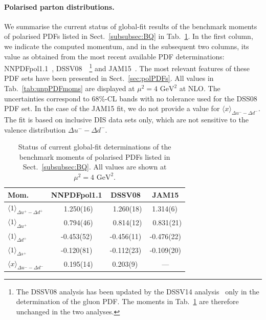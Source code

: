 \paragraph{Polarised parton distributions.}
%
We summarise the current status of global-fit results of the benchmark
moments of polarised PDFs listed in Sect.~\ref{subsubsec:BQ} in 
Tab.~\ref{tab:polPDFmoms}.
%
In the first column, we indicate the computed momentum, and in the subsequent 
two columns, its value as obtained from the most recent available PDF 
determinations: NNPDFpol1.1~\cite{Nocera:2014gqa}, 
DSSV08~\cite{deFlorian:2009vb}~\footnote{The DSSV08 analysis has been updated
by the DSSV14 analysis~\cite{deFlorian:2014yva} only in the determination
of the gluon PDF. The moments in Tab.~\ref{tab:polPDFmoms} are therefore  
unchanged in the two analyses.} and JAM15~\cite{Sato:2016tuz}.
%
The most relevant features of these PDF sets have been presented in
Sect.~\ref{sec:polPDFs}.
%
All values in Tab.~\ref{tab:unpPDFmoms} are displayed
at $\mu^2=4\mbox{ GeV}^2$ at NLO.
%
The uncertainties correspond to 68\%-CL bands with no tolerance used for the 
DSS08 PDF set.
%
In the case of the JAM15 fit, we do not provide a value for 
$\langle x \rangle _{\Delta u^--\Delta d^-}$.
%
The fit is based on inclusive DIS data sets only, which are not sensitive to 
the valence distribution $\Delta u^- - \Delta d^-$.

\begin{table}[!t]
\centering
\renewcommand{\arraystretch}{1.2}
\begin{tabular}{lccc}
\toprule
Mom. 
& NNPDFpol1.1 & DSSV08 & JAM15 \\
\midrule
$\langle 1 \rangle_{\Delta u^+-\Delta d^+}$ &
\ 1.250(16) & \ 1.260(18) & 1.314(6)\, \\
$\langle 1 \rangle_{\Delta u^+}$ &
\ 0.794(46) & \ 0.814(12) & \ 0.831(21)\\
$\langle 1 \rangle_{\Delta d^+}$ &  
-0.453(52)  &  -0.456(11) &  -0.476(22)\\
$\langle 1 \rangle_{\Delta s^+}$ &  
-0.120(81)  &  -0.112(23) &  -0.109(20)\\
$\langle x \rangle_{\Delta u^- - \Delta d^-}$ &     
\ 0.195(14) &  0.203(9)\, &  --- \\
\bottomrule
\end{tabular}
\caption{\small Status of current global-fit determinations of the 
benchmark moments of polarised PDFs listed in Sect.~\ref{subsubsec:BQ}.
All values are shown at $\mu^2=4\mbox{ GeV}^2$.}
\label{tab:polPDFmoms}
\end{table}

